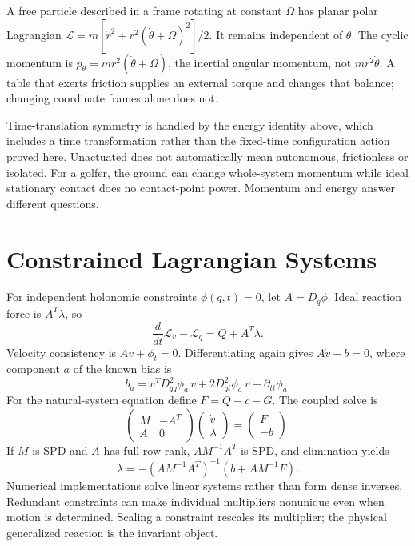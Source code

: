 A free particle described in a frame rotating at constant $\Omega$ has planar polar Lagrangian $\mathcal L=m[\dot r^2+r^2(\dot\theta+\Omega)^2]/2$. It remains independent of $\theta$. The cyclic momentum is $p_\theta=mr^2(\dot\theta+\Omega)$, the inertial angular momentum, not $mr^2\dot\theta$. A table that exerts friction supplies an external torque and changes that balance; changing coordinate frames alone does not.

Time-translation symmetry is handled by the energy identity above, which includes a time transformation rather than the fixed-time configuration action proved here. Unactuated does not automatically mean autonomous, frictionless or isolated. For a golfer, the ground can change whole-system momentum while ideal stationary contact does no contact-point power. Momentum and energy answer different questions.

\section{Constrained Lagrangian Systems}
\label{sec:lagrangian_constraints}

For independent holonomic constraints $\phi(q,t)=0$, let $A=D_q\phi$. Ideal reaction force is $A^T\lambda$, so
\begin{equation}
\frac{d}{dt}\mathcal L_v-\mathcal L_q=Q+A^T\lambda.
\label{eq:lagrange_multipliers}
\end{equation}
Velocity consistency is $Av+\phi_t=0$. Differentiating again gives $A\dot v+b=0$, where component $a$ of the known bias is
\begin{equation}
b_a=v^TD_{qq}^2\phi_a\,v+2D_{qt}^2\phi_a\,v+\partial_{tt}\phi_a.
\label{eq:lagrangian_constraint_bias}
\end{equation}
For the natural-system equation define $F=Q-c-G$. The coupled solve is
\begin{equation}
\begin{pmatrix}M&-A^T\\A&0\end{pmatrix}
\begin{pmatrix}\dot v\\\lambda\end{pmatrix}
=\begin{pmatrix}F\\-b\end{pmatrix}.
\label{eq:lagrangian_constraint_solve}
\end{equation}
If $M$ is SPD and $A$ has full row rank, $AM^{-1}A^T$ is SPD, and elimination yields
\begin{equation}
\lambda=-(AM^{-1}A^T)^{-1}(b+AM^{-1}F).
\end{equation}
 Numerical implementations solve linear systems rather than form dense inverses. Redundant constraints can make individual multipliers nonunique even when motion is determined. Scaling a constraint rescales its multiplier; the physical generalized reaction is the invariant object.

